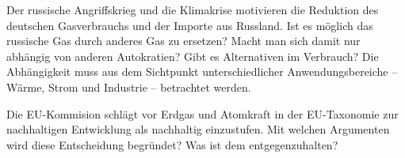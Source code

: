 
Der russische Angriffskrieg und die Klimakrise motivieren die Reduktion des deutschen Gasverbrauchs und der Importe aus Russland. Ist es möglich das russische Gas durch anderes Gas zu ersetzen? Macht man sich damit nur abhängig von anderen Autokratien? Gibt es Alternativen im Verbrauch? Die Abhängigkeit muss aus dem Sichtpunkt unterschiedlicher Anwendungsbereiche -- Wärme, Strom und Industrie -- betrachtet werden. 

Die EU-Kommision schlägt vor Erdgas und Atomkraft in der EU-Taxonomie zur nachhaltigen Entwicklung als nachhaltig einzustufen. Mit welchen Argumenten wird diese Entscheidung begründet? Was ist dem entgegenzuhalten?